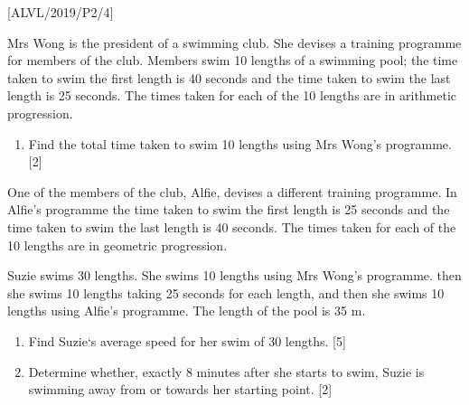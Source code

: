 \item {[}ALVL/2019/P2/4{]} 

Mrs Wong is the president of a swimming club. She devises a training
programme for members of the club. Members swim 10 lengths of a swimming
pool; the time taken to swim the first length is 40 seconds and the
time taken to swim the last length is 25 seconds. The times taken
for each of the 10 lengths are in arithmetic progression.
\begin{enumerate}
\item Find the total time taken to swim 10 lengths using Mrs Wong's programme.
\hfill{}{[}2{]}
\end{enumerate}
One of the members of the club, Alfie, devises a different training
programme. In Alfie's programme the time taken to swim the first length
is 25 seconds and the time taken to swim the last length is 40 seconds.
The times taken for each of the 10 lengths are in geometric progression.

Suzie swims 30 lengths. She swims 10 lengths using Mrs Wong\textquoteright s
programme. then she swims 10 lengths taking 25 seconds for each length,
and then she swims 10 lengths using Alfie\textquoteright s programme.
The length of the pool is 35 m.
\begin{enumerate}
\item Find Suzie\textquoteleft s average speed for her swim of 30 lengths.
\hfill{}{[}5{]}
\item Determine whether, exactly 8 minutes after she starts to swim, Suzie
is swimming away from or towards her starting point. \hfill{} {[}2{]}
\end{enumerate}
